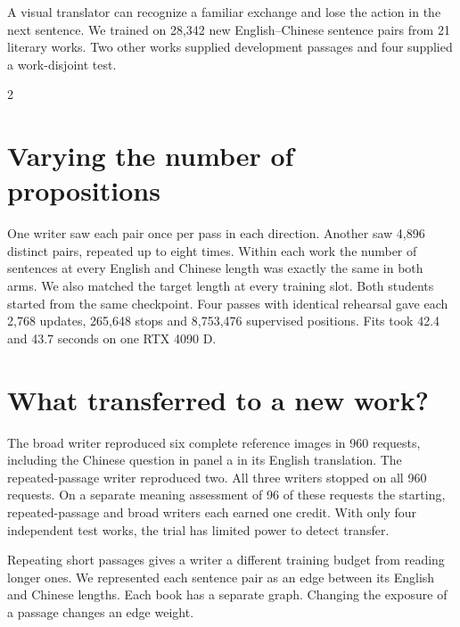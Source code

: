 \newpage
{}
\noindent A visual translator can recognize a familiar exchange and lose the action in the next sentence. We trained on 28,342 new English--Chinese sentence pairs from 21 literary works. Two other works supplied development passages and four supplied a work-disjoint test.
\begin{multicols}{2}
\section*{Varying the number of propositions}
One writer saw each pair once per pass in each direction. Another saw 4,896 distinct pairs, repeated up to eight times. Within each work the number of sentences at every English and Chinese length was exactly the same in both arms. We also matched the target length at every training slot. Both students started from the same checkpoint. Four passes with identical rehearsal gave each 2,768 updates, 265,648 stops and 8,753,476 supervised positions. Fits took 42.4 and 43.7 seconds on one RTX 4090 D.
\section*{What transferred to a new work?}
The broad writer reproduced six complete reference images in 960 requests, including the Chinese question in panel a in its English translation. The repeated-passage writer reproduced two. All three writers stopped on all 960 requests. On a separate meaning assessment of 96 of these requests the starting, repeated-passage and broad writers each earned one credit. With only four independent test works, the trial has limited power to detect transfer.
\end{multicols}
\newpage
{}
\noindent Repeating short passages gives a writer a different training budget from reading longer ones. We represented each sentence pair as an edge between its English and Chinese lengths. Each book has a separate graph. Changing the exposure of a passage changes an edge weight.
